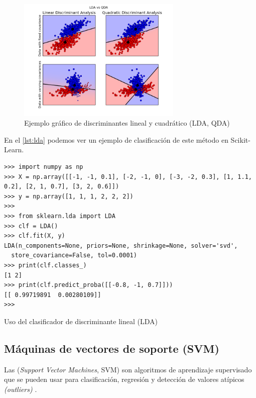 \begin{figure}[htbp]
\centering
\includegraphics[width=0.7\textwidth]{plot_lda_qda_0011}
\caption[Ejemplo gráfico de discriminantes lineal y cuadrático (LDA, QDA)]{Ejemplo gráfico de discriminantes lineal y cuadrático (LDA, QDA) \citep{Pedregosa2011}}
\label{fig:lda-qda}
\end{figure}

En el \autoref{lst:lda} podemos ver un ejemplo de clasificación de este método en Scikit-Learn.

\begin{listing}[htbp]
\begin{verbatim}
>>> import numpy as np
>>> X = np.array([[-1, -1, 0.1], [-2, -1, 0], [-3, -2, 0.3], [1, 1.1, 0.2], [2, 1, 0.7], [3, 2, 0.6]])
>>> y = np.array([1, 1, 1, 2, 2, 2])
>>> 
>>> from sklearn.lda import LDA
>>> clf = LDA()
>>> clf.fit(X, y)
LDA(n_components=None, priors=None, shrinkage=None, solver='svd',
  store_covariance=False, tol=0.0001)
>>> print(clf.classes_)
[1 2]
>>> print(clf.predict_proba([[-0.8, -1, 0.7]]))
[[ 0.99719891  0.00280109]]
>>> 
\end{verbatim}
\caption{Uso del clasificador de discriminante lineal (LDA)}
\label{lst:lda}
\end{listing}


\subsection{Máquinas de vectores de soporte (SVM)}

Las  (\emph{Support Vector Machines}, SVM) son algoritmos de aprendizaje supervisado que se pueden usar para clasificación, regresión y detección de valores atípicos \emph{(outliers)} \citep{Pedregosa2011}.


